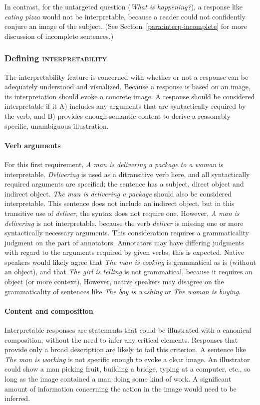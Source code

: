 \documentclass[12pt]{article}
\newcommand{\feat}[1]{\textsc{#1}}
\begin{document}
In contrast, for the untargeted question (\textit{What is happening?}), a response like \textit{eating pizza} would not be interpretable, because a reader could not confidently conjure an image of the subject. (See Section~\ref{para:interp-incomplete} for more discussion of incomplete sentences.)

\subsubsection{Defining \feat{interpretability}} The interpretability feature is concerned with whether or not a response can be adequately understood and visualized. Because a response is based on an image, its interpretation should evoke a concrete image. A response should be considered interpretable if it A) includes any arguments that are syntactically required by the verb, and B) provides enough semantic content to derive a reasonably specific, unambiguous illustration.

\paragraph{Verb arguments} \label{para:interp-arguments} For this first requirement, \textit{A man is delivering a package to a woman} is interpretable. \textit{Delivering} is used as a ditransitive verb here, and all syntactically required arguments are specified; the sentence has a subject, direct object and indirect object. \textit{The man is delivering a package} should also be considered interpretable. This sentence does not include an indirect object, but in this transitive use of \textit{deliver}, the syntax does not require one. However, \textit{A man is delivering} is not interpretable, because the verb \textit{deliver} is missing one or more syntactically necessary arguments. This consideration requires a grammaticality judgment on the part of annotators. Annotators may have differing judgments with regard to the arguments required by given verbs; this is expected. Native speakers would likely agree that \textit{The man is cooking} is grammatical as is (without an object), and that \textit{The girl is telling} is not grammatical, because it requires an object (or more context). However, native speakers may disagree on the grammaticality of sentences like \textit{The boy is washing} or \textit{The woman is buying}.

\paragraph{Content and composition} Interpretable responses are statements that could be illustrated with a canonical composition, without the need to infer any critical elements. Responses that provide only a broad description are likely to fail this criterion. A sentence like \textit{The man is working} is not specific enough to evoke a clear image. An illustrator could show a man picking fruit, building a bridge, typing at a computer, etc., so long as the image contained a man doing some kind of work. A significant amount of information concerning the action in the image would need to be inferred.
\end{document}
